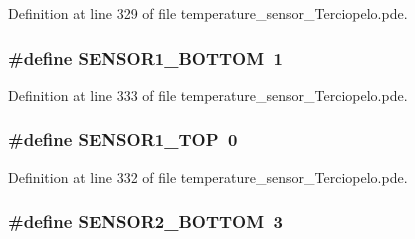 Definition at line 329 of file temperature\_\-sensor\_\-Terciopelo.pde.\hypertarget{applet_2temperature__sensor___terciopelo_8pde_0da2a51dcb3e00b10aedd07d75f22382}{
\subsubsection[{SENSOR1\_\-BOTTOM}]{\setlength{\rightskip}{0pt plus 5cm}\#define SENSOR1\_\-BOTTOM~1}}
\label{applet_2temperature__sensor___terciopelo_8pde_0da2a51dcb3e00b10aedd07d75f22382}




Definition at line 333 of file temperature\_\-sensor\_\-Terciopelo.pde.\hypertarget{applet_2temperature__sensor___terciopelo_8pde_2a2946288d28852ba343b09fd4f17d7a}{
\subsubsection[{SENSOR1\_\-TOP}]{\setlength{\rightskip}{0pt plus 5cm}\#define SENSOR1\_\-TOP~0}}
\label{applet_2temperature__sensor___terciopelo_8pde_2a2946288d28852ba343b09fd4f17d7a}




Definition at line 332 of file temperature\_\-sensor\_\-Terciopelo.pde.\hypertarget{applet_2temperature__sensor___terciopelo_8pde_df66e6da6cf8c78004dc0a75fd14d3b1}{
\subsubsection[{SENSOR2\_\-BOTTOM}]{\setlength{\rightskip}{0pt plus 5cm}\#define SENSOR2\_\-BOTTOM~3}}
\label{applet_2temperature__sensor___terciopelo_8pde_df66e6da6cf8c78004dc0a75fd14d3b1}




